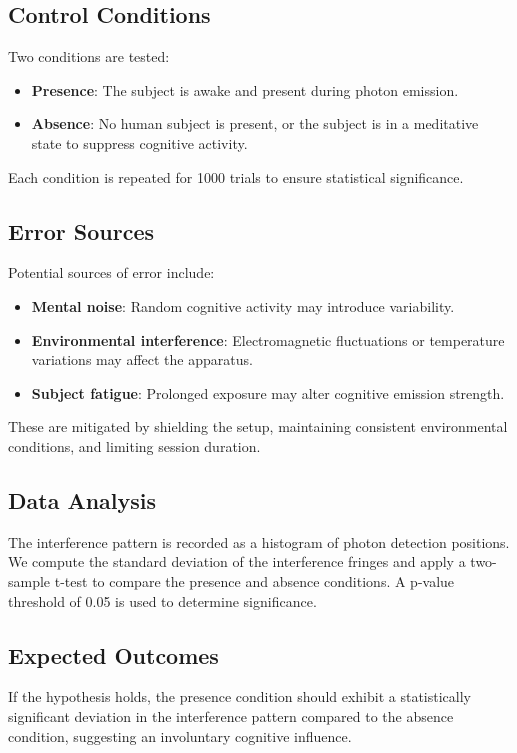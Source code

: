\documentclass[12pt]{IEEEtran}
\begin{document}
\subsection{Control Conditions}
Two conditions are tested:
\begin{itemize}
    \item \textbf{Presence}: The subject is awake and present during photon emission.
    \item \textbf{Absence}: No human subject is present, or the subject is in a meditative state to suppress cognitive activity.
\end{itemize}
Each condition is repeated for 1000 trials to ensure statistical significance.

\subsection{Error Sources}
Potential sources of error include:
\begin{itemize}
    \item \textbf{Mental noise}: Random cognitive activity may introduce variability.
    \item \textbf{Environmental interference}: Electromagnetic fluctuations or temperature variations may affect the apparatus.
    \item \textbf{Subject fatigue}: Prolonged exposure may alter cognitive emission strength.
\end{itemize}
These are mitigated by shielding the setup, maintaining consistent environmental conditions, and limiting session duration.

\subsection{Data Analysis}
The interference pattern is recorded as a histogram of photon detection positions. We compute the standard deviation of the interference fringes and apply a two-sample t-test to compare the presence and absence conditions. A p-value threshold of 0.05 is used to determine significance.

\subsection{Expected Outcomes}
If the hypothesis holds, the presence condition should exhibit a statistically significant deviation in the interference pattern compared to the absence condition, suggesting an involuntary cognitive influence.
\end{document}
